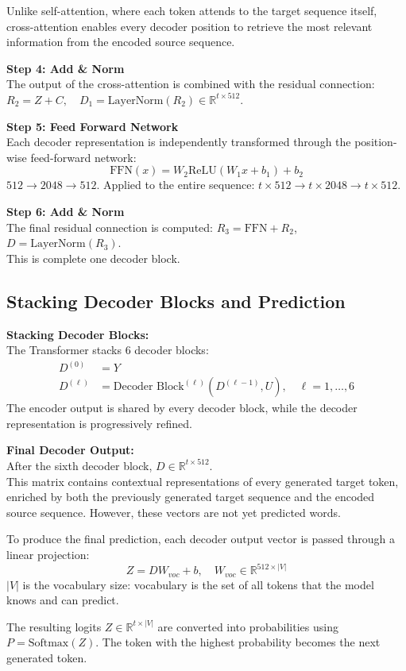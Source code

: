 Unlike self-attention, where each token attends to the target sequence itself, cross-attention enables every decoder position to retrieve the most relevant information from the encoded source sequence.

\textbf{Step 4: Add \& Norm} \\
The output of the cross-attention is combined with the residual connection:
$R_2 = Z + C, \quad D_1 = \text{LayerNorm}(R_2) \in \mathbb{R}^{t \times 512}$.

\textbf{Step 5: Feed Forward Network} \\
Each decoder representation is independently transformed through the position-wise feed-forward network:
\begin{equation}
\text{FFN}(x) = W_2 \text{ReLU}(W_1 x + b_1) + b_2
\end{equation}
$512 \to 2048 \to 512$. Applied to the entire sequence: $t \times 512 \to t \times 2048 \to t \times 512$.

\textbf{Step 6: Add \& Norm} \\
The final residual connection is computed: $R_3 = \text{FFN} + R_2$, $D = \text{LayerNorm}(R_3)$. \\
This is complete one decoder block.

\subsection{Stacking Decoder Blocks and Prediction}
\textbf{Stacking Decoder Blocks:} \\
The Transformer stacks 6 decoder blocks:
\begin{align}
D^{(0)} &= Y \\
D^{(\ell)} &= \text{Decoder Block}^{(\ell)}\left(D^{(\ell-1)}, U\right), \quad \ell = 1, \dots, 6
\end{align}
The encoder output is shared by every decoder block, while the decoder representation is progressively refined.

\textbf{Final Decoder Output:} \\
After the sixth decoder block, $D \in \mathbb{R}^{t \times 512}$. \\
This matrix contains contextual representations of every generated target token, enriched by both the previously generated target sequence and the encoded source sequence. However, these vectors are not yet predicted words.

To produce the final prediction, each decoder output vector is passed through a linear projection:
\begin{equation}
Z = D W_{voc} + b, \quad W_{voc} \in \mathbb{R}^{512 \times |V|}
\end{equation}
$|V|$ is the vocabulary size: vocabulary is the set of all tokens that the model knows and can predict.

The resulting logits $Z \in \mathbb{R}^{t \times |V|}$ are converted into probabilities using $P = \text{Softmax}(Z)$. The token with the highest probability becomes the next generated token.



